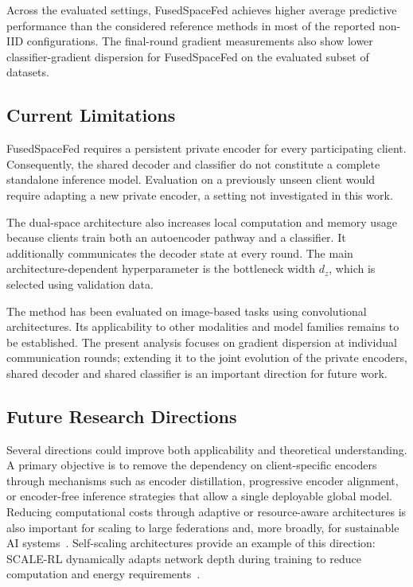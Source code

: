 \documentclass[twoside]{article}
\theoremstyle{thmstyleone}%
\theoremstyle{thmstyletwo}%
\theoremstyle{thmstylethree}%
\begin{document}
Across the evaluated settings, FusedSpaceFed achieves
higher average predictive performance than the considered reference methods in
most of the reported non-IID configurations. The final-round gradient
measurements also show lower classifier-gradient dispersion for FusedSpaceFed
on the evaluated subset of datasets.

\subsection{Current Limitations}

FusedSpaceFed requires a persistent private encoder for every participating
client. Consequently, the shared decoder and classifier do not constitute a
complete standalone inference model. Evaluation on a previously unseen client
would require adapting a new private encoder, a setting not investigated in
this work.

The dual-space architecture also increases local computation and memory usage
because clients train both an autoencoder pathway and a classifier. It
additionally communicates the decoder state at every round. The main
architecture-dependent hyperparameter is the bottleneck width $d_z$, which is
selected using validation data.

The method has been evaluated on image-based tasks using convolutional
architectures. Its applicability to other modalities and model families
remains to be established. The present analysis focuses on gradient dispersion
at individual communication rounds; extending it to the joint evolution of
the private encoders, shared decoder and shared classifier is an important
direction for future work.

\subsection{Future Research Directions}

Several directions could improve both applicability and theoretical understanding. A primary objective is to remove the dependency on client-specific encoders through mechanisms such as encoder distillation, progressive encoder alignment, or encoder-free inference strategies that allow a single deployable global model. Reducing computational costs through adaptive or resource-aware architectures is also important for scaling to large federations and, more broadly, for sustainable AI systems~\cite{amato2024sustainability}. Self-scaling architectures provide an example of this direction: SCALE-RL dynamically adapts network depth during training to reduce computation and energy requirements~\cite{veglio2026scalerl}.
\end{document}
